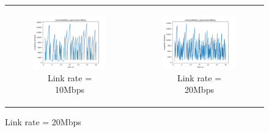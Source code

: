 \documentclass[11pt]{article}
\begin{document}
\begin{figure}[H]
\begin{tabular}[c]{cc}
    \begin{subfigure}[c]{0.5\textwidth}
      \centering
      \includegraphics[width=\textwidth]{Q2/outputs/channel6Mbps_application2Mbps.png}
      \caption{Link rate = 10Mbps}
    \end{subfigure}&

    \begin{subfigure}[c]{0.5\textwidth}
      \centering
      \includegraphics[width=\textwidth]{Q2/outputs/channel6Mbps_application4Mbps.png}
      \caption{Link rate = 20Mbps}
    \end{subfigure}\\


\end{tabular}
\end{figure}
\end{document}
